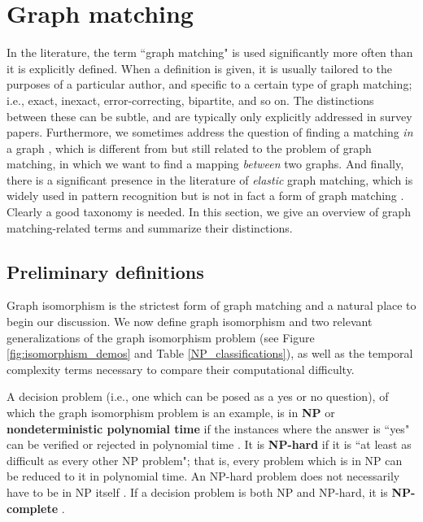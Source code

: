 \documentclass[12pt]{thesis}
\theoremstyle{plain}
\theoremstyle{definition}
\theoremstyle{remark}
\begin{document}
\section{Graph matching}\label{section:defining_graph_matching}

In the literature, the term ``graph matching" is used significantly more often than it is explicitly defined. When a definition is given, it is usually tailored to the purposes of a particular author, and specific to a certain type of graph matching; i.e., exact, inexact, error-correcting, bipartite, and so on. The distinctions between these can be subtle, and are typically only explicitly addressed in survey papers. Furthermore, we sometimes address the question of finding a matching \textit{in} a graph \cite{wikiMatchingInAGraph}, which is different from but still related to the problem of graph matching, in which we want to find a mapping \textit{between} two graphs. And finally, there is a significant presence in the literature of \textit{elastic} graph matching, which is widely used in pattern recognition but is not in fact a form of graph matching \cite{Conte_2003}. Clearly a good taxonomy is needed. In this section, we give an overview of graph matching-related terms and summarize their distinctions.

\subsection{Preliminary definitions}

Graph isomorphism is the strictest form of graph matching and a natural place to begin our discussion. We now define graph isomorphism and two relevant generalizations of the graph isomorphism problem (see Figure \ref{fig:isomorphism_demos} and Table \ref{NP_classifications}), as well as the temporal complexity terms necessary to compare their computational difficulty.

A decision problem (i.e., one which can be posed as a yes or no question), of which the graph isomorphism problem is an example, is in \textbf{NP} or \textbf{nondeterministic polynomial time} if the instances where the answer is ``yes" can be verified or rejected in polynomial time \cite{Hartmanis_1982,wikiNPComplexity}. It is \textbf{NP-hard} if it is ``at least as difficult as every other NP problem"; that is, every problem which is in NP can be reduced to it in polynomial time. An NP-hard problem does not necessarily have to be in NP itself  \cite{Hartmanis_1982,wikiNPHardness}. If a decision problem is both NP and NP-hard, it is \textbf{NP-complete} \cite{Hartmanis_1982,wikiNPCompleteness}.
\end{document}
